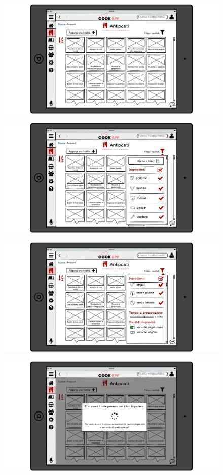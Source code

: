 \begin{figure}[H]
	\centering
	\includegraphics[width=0.95\linewidth]{img/mockup/Ricettario-antipasti.png}
\end{figure}
\begin{figure}[H]
	\centering
	\includegraphics[width=0.95\linewidth]{img/mockup/Ricettario-antipasti-filtro.png}
\end{figure}
\begin{figure}[H]
	\centering
	\includegraphics[width=0.95\linewidth]{img/mockup/Ricettario-antipasti-filtro2.png}
\end{figure}
\begin{figure}[H]
	\centering
	\includegraphics[width=0.95\linewidth]{img/mockup/Ricettario-antipasti-filtro3.png}
\end{figure}

